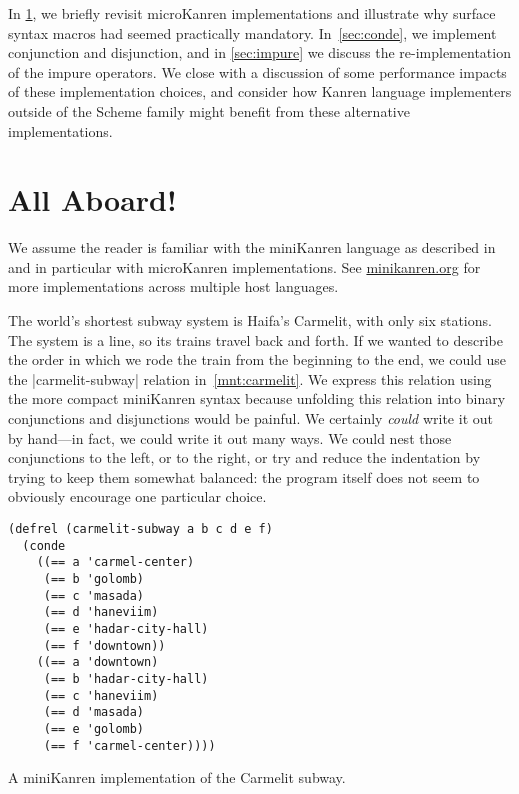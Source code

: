 \documentclass[sigplan,screen,draft,anonymous,review,natbib=false]{acmart}
\begin{document}
In \cref{sec:all-aboard}, we briefly revisit microKanren
implementations and illustrate why surface syntax
macros had seemed practically mandatory. In~\cref{sec:conde}, we implement conjunction and disjunction, and in
\cref{sec:impure} we discuss the re-implementation of the impure
operators. We close with a discussion of some performance impacts of
these implementation choices, and consider how Kanren language
implementers outside of the Scheme family might benefit from these
alternative implementations.

\section{All Aboard!}\label{sec:all-aboard}

We assume the reader is familiar with the miniKanren language as
described in  and in particular with
microKanren implementations. See \href{minikanren.org}{minikanren.org}
for more implementations across multiple host languages.

The world's shortest subway system is Haifa's Carmelit, with only
six stations. The system is a line, so its trains travel back and
forth. If we wanted to describe the order in which we rode the train
from the beginning to the end, we could use the
\rackinline|carmelit-subway| relation in~\cref{mnt:carmelit}. We
express this relation using the more compact miniKanren syntax because
unfolding this relation into binary conjunctions and disjunctions
would be painful. We certainly \emph{could} write it out by hand---in
fact, we could write it out many ways. We could nest those
conjunctions to the left, or to the right, or try and reduce the
indentation by trying to keep them somewhat balanced: the program
itself does not seem to obviously encourage one particular choice.

\begin{listing}
  \begin{verbatim}
(defrel (carmelit-subway a b c d e f)
  (conde
    ((== a 'carmel-center)
     (== b 'golomb)
     (== c 'masada)
     (== d 'haneviim)
     (== e 'hadar-city-hall)
     (== f 'downtown))
    ((== a 'downtown)
     (== b 'hadar-city-hall)
     (== c 'haneviim)
     (== d 'masada)
     (== e 'golomb)
     (== f 'carmel-center))))
  \end{verbatim}
  \caption{A miniKanren implementation of the Carmelit subway.}
  \label{mnt:carmelit}
\end{listing}
\end{document}

